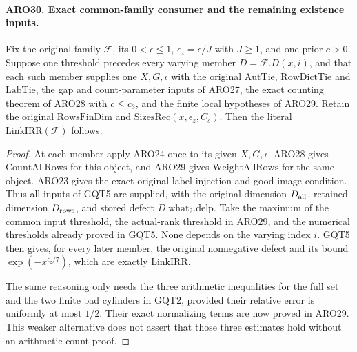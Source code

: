 \documentclass[11pt,a4paper]{article}
\numberwithin{equation}{section}
\theoremstyle{remark}\newtheorem{remark}[theorem]{Remark}
\begin{document}
\paragraph{ARO30. Exact common-family consumer and the remaining existence inputs.}
\label{claim:ARO30}
Fix the original family \(\mathcal F\), its \(0<\epsilon\leq1\),
\(\epsilon_z=\epsilon/J\) with \(J\geq1\), and one prior
\(c>0\).  Suppose one threshold precedes every varying member
\(D=\mathcal F.D(x,i)\), and that each such member supplies one
\(X,G,\iota\) with the original \(\mathrm{AutTie}\),
\(\mathrm{RowDictTie}\) and \(\mathrm{LabTie}\), the gap and
count-parameter inputs of ARO27, the exact counting theorem of
ARO28 with \(c\leq c_3\), and the finite local hypotheses of
ARO29.  Retain the original \(\mathrm{RowsFinDim}\) and
\(\mathrm{SizesRec}(x,\epsilon_z,C_s)\).
Then the literal \(\mathrm{LinkIRR}(\mathcal F)\) follows.
\begin{proof}
At each member apply ARO24 once to its given \(X,G,\iota\).
ARO28 gives \(\mathrm{CountAllRows}\) for this object, and ARO29
gives \(\mathrm{WeightAllRows}\) for the same object.  ARO23
gives the exact original label injection and good-image condition.
Thus all inputs of GQT5 are supplied, with the original dimension
\(D_{\rm all}\), retained dimension \(D_{\rm rows}\), and stored
defect \(D.\mathrm{what}_2.\mathrm{delp}\).
Take the maximum of the common input threshold, the actual-rank
threshold in ARO29, and the numerical thresholds already proved
in GQT5.  None depends on the varying index \(i\).  GQT5 then
gives, for every later member, the original nonnegative defect and
its bound \(\exp(-x^{\epsilon_z/7})\), which are exactly
\(\mathrm{LinkIRR}\).

The same reasoning only needs the three arithmetic inequalities
for the full set and the two finite bad cylinders in GQT2,
provided their relative error is uniformly at most \(1/2\).
Their exact normalizing terms are now proved in ARO29.  This
weaker alternative does not assert that those three estimates
hold without an arithmetic count proof.
\end{proof}
\end{document}
